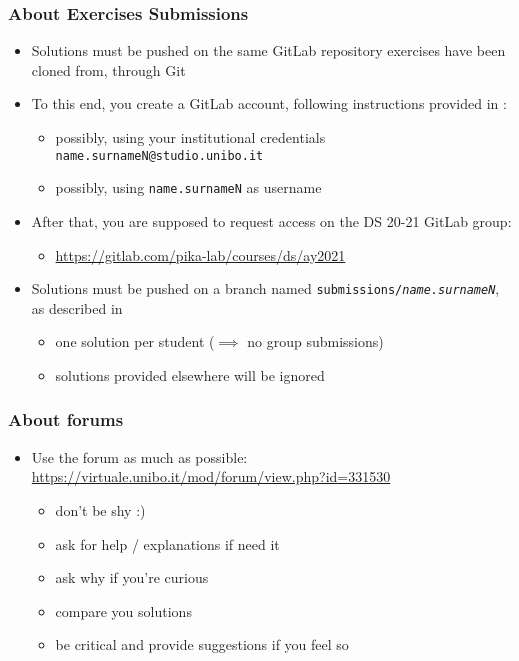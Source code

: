\documentclass[presentation]{beamer}\mode<presentation>{\usetheme{AMSCesenaPurpleAndGold}}
\begin{document}
\begin{frame}%
    \frametitle{About Exercises Submissions}

    \begin{itemize}
        \item Solutions must be pushed on the same GitLab repository exercises have been cloned from, \alert{through Git}

        \vfill

        \item To this end, you create a GitLab account, following instructions provided in :
        \begin{itemize}
            \item possibly, using your institutional credentials \texttt{\alert{name.surnameN}@studio.unibo.it}
            \item possibly, using \texttt{\alert{name.surnameN}} as username
        \end{itemize}

        \vfill

        \item After that, you are supposed to request access on the DS 20-21 GitLab group:
        \begin{itemize}
            \item \url{https://gitlab.com/pika-lab/courses/ds/ay2021}
        \end{itemize}

        \vfill

        \item Solutions must be pushed on a branch named \alert{\texttt{submissions/\textit{name.surnameN}}}, as described in 
        \begin{itemize}
            \item one solution per student ($\implies$ no group submissions)
            \item solutions provided elsewhere will be ignored
        \end{itemize}
    \end{itemize}
\end{frame}

\begin{frame}%
\frametitle{About forums}
    \begin{itemize}
        \item Use the forum as much as possible: \url{https://virtuale.unibo.it/mod/forum/view.php?id=331530}
        \begin{itemize}
            \item don't be shy :)
            \item ask for help / explanations if need it
            \item ask why if you're curious
            \item compare you solutions
            \item be critical and provide suggestions if you feel so
        \end{itemize}
    \end{itemize}
\end{frame}
\end{document}
